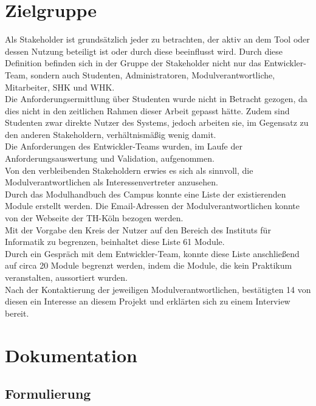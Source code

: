 \section{Zielgruppe}

Als Stakeholder ist grundsätzlich jeder zu betrachten, der aktiv an dem Tool oder dessen Nutzung beteiligt ist oder durch diese beeinflusst wird. Durch diese Definition befinden sich in der Gruppe der Stakeholder nicht nur das Entwickler-Team, sondern auch Studenten, Administratoren, Modulverantwortliche, Mitarbeiter, \ac{SHK} und \ac{WHK}. \\[1em]

Die Anforderungsermittlung über Studenten wurde nicht in Betracht gezogen, da dies nicht in den zeitlichen Rahmen dieser Arbeit gepasst hätte. Zudem sind Studenten zwar direkte Nutzer des Systems, jedoch arbeiten sie, im Gegensatz zu den anderen Stakeholdern, verhältnismäßig wenig damit.\\
Die Anforderungen des Entwickler-Teams wurden, im Laufe der Anforderungsauswertung  und Validation, aufgenommen.\\
Von den verbleibenden Stakeholdern erwies es sich als sinnvoll, die Modulverantwortlichen als Interessenvertreter anzusehen.\\[1em]

Durch das Modulhandbuch des Campus konnte eine Liste der existierenden Module erstellt werden. Die Email-Adressen der Modulverantwortlichen konnte von der Webseite der TH-Köln bezogen werden.\\
Mit der Vorgabe den Kreis der Nutzer auf den Bereich des Instituts für Informatik zu begrenzen, beinhaltet diese Liste 61 Module.\\

Durch ein Gespräch mit dem Entwickler-Team, konnte diese Liste anschließend auf circa 20 Module begrenzt werden, indem die Module, die kein Praktikum veranstalten, aussortiert wurden.\\

Nach der Kontaktierung der jeweiligen Modulverantwortlichen, bestätigten 14 von diesen ein Interesse an diesem Projekt und erklärten sich zu einem Interview bereit.

\section{Dokumentation}
\label{sec:dokumentation}

\subsection{Formulierung}

